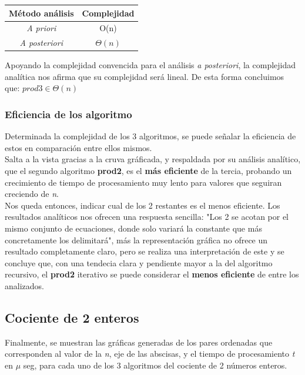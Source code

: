 \documentclass{report}
\begin{document}
                \begin{table}[h!]
                    \centering
                    \begin{tabular}{c | c}
                        Método análisis & Complejidad \\ \hline
                        \textit{A priori} & O(n)\\
                        \textit{A posteriori} & $\Theta(n)$\\
                    \end{tabular}
                \end{table}
                
                Apoyando la complejidad convencida para el análisis \textit{a posteriori}, la complejidad analítica nos afirma que su complejidad será lineal. De esta forma concluimos que: $prod3 \in \Theta(n)$
                
        \subsubsection{Eficiencia de los algoritmo}
            Determinada la complejidad de los 3 algoritmos, se puede señalar la eficiencia de estos en comparación entre ellos mismos.\\
            Salta a la vista gracias a la cruva gráficada, y respaldada por su análisis analítico, que el segundo algoritmo \textbf{prod2}, es el \textbf{más eficiente} de la tercia, probando un crecimiento de tiempo de procesamiento muy lento para valores que seguiran creciendo de \textit{n}.\\
            Nos queda entonces, indicar cual de los 2 restantes es el menos eficiente. Los resultados analíticos nos ofrecen una respuesta sencilla: "Los 2 se acotan por el mismo conjunto de ecuaciones, donde solo variará la constante que más concretamente los delimitará", más la representación gráfica no ofrece un resultado completamente claro, pero se realiza una interpretación de este y se concluye que, con una tendecia clara y pendiente mayor a la del algoritmo recursivo, el \textbf{prod2} iterativo se puede considerar el \textbf{menos eficiente} de entre los analizados.
                
    \subsection*{Cociente de 2 enteros}
        Finalmente, se muestran las gráficas generadas de los pares ordenadas que corresponden al valor de la \textit{n}, eje de las abscisas, y el tiempo de procesamiento \textit{t} en $\mu$ seg, para cada uno de los 3 algoritmos del cociente de 2 números enteros.\\
\end{document}
